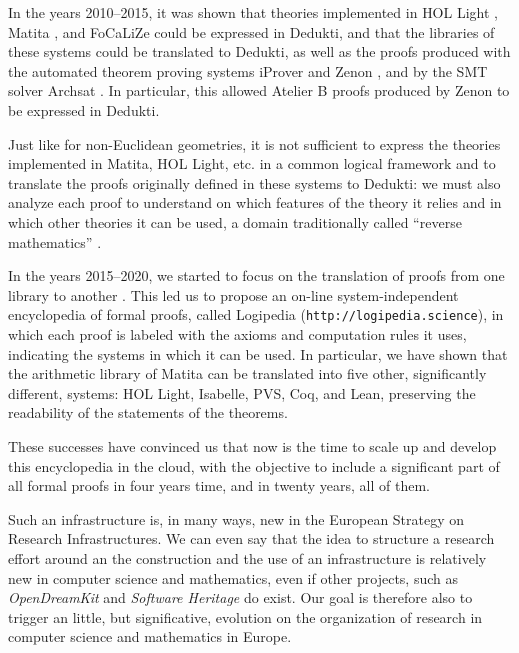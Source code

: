In the years 2010--2015, it was shown that theories implemented in
{\sc HOL Light} \cite{Assaf12}, {\sc Matita} \cite{Assaf15}, and {\sc
  FoCaLiZe} \cite{Cauderlier16} could be expressed in {\sc Dedukti},
and that the libraries of these systems could be translated to {\sc
  Dedukti}, as well as the proofs produced with the automated theorem
proving systems {\sc iProver} \cite{Burel10} and {\sc Zenon}
\cite{CauderlierHalmagrand15}, and by the SMT solver {\sc Archsat}
\cite{Bury19}. In particular, this allowed {\sc Atelier B} proofs
produced by {\sc Zenon} to be expressed in {\sc Dedukti}.

Just like for non-Euclidean geometries, it is not sufficient to
express the theories implemented in {\sc Matita}, {\sc HOL Light},
etc.  in a common logical framework and to translate the proofs
originally defined in these systems to {\sc Dedukti}: we must also
analyze each proof to understand on which features of the theory it
relies and in which other theories it can be used, a domain
traditionally called ``reverse mathematics''
\cite{Friedman76,Simpson09,Dowek17}.

In the years 2015--2020, we started to focus on the translation of
proofs from one library to another \cite{Dowek17,Thire18}. This led us
to propose an on-line system-independent encyclopedia of formal
proofs, called {\sc Logipedia} ({\tt http://logipedia.science}), in
which each proof is labeled with the axioms and computation rules it
uses, indicating the systems in which it can be used. In particular,
we have shown that the arithmetic library of {\sc Matita} can be
translated into five other, significantly different, systems: {\sc HOL
  Light}, {\sc Isabelle}, {\sc PVS}, {\sc Coq}, and {\sc Lean},
preserving the readability of the statements of the theorems.

These successes have convinced us that now is the time to scale up and
develop this encyclopedia in the cloud, with the objective to include
a significant part of all formal proofs in four years time, and in
twenty years, all of them.

Such an infrastructure is, in many ways, new in the European Strategy
on Research Infrastructures. We can even say that the idea to
structure a research effort around an the construction and the use of
an infrastructure is relatively new in computer science and
mathematics, even if other projects, such as {\em OpenDreamKit} and
{\em Software Heritage} do exist. Our goal is therefore also to
trigger an little, but significative, evolution on the organization of
research in computer science and mathematics in Europe.



